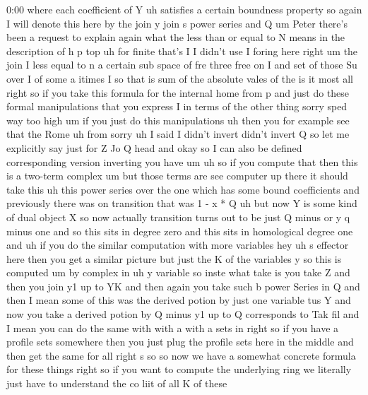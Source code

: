 \begin{unfinished}{0:00}
where  each  coefficient  of  Y  uh  satisfies
a  certain  boundness  property  so  again  I
will  denote  this  here  by  the
join  y  join  s  power  series  and
Q  um  Peter  there's  been  a  request  to
explain  again  what  the  less  than  or
equal  to  N  means  in  the  description  of  h
p
top
uh  for
finite
that's
I  I  didn't  use  I  foring  here  right
um  the  join  I  less  equal  to  n  a  certain
sub  space  of
fre  three  free  on  I  and  set  of  those  Su
over  I  of  some  a  itimes
I  so  that  is  sum  of  the  absolute  vales
of
the  is  it
most
all  right  so  if  you  take  this  formula
for  the  internal  home  from  p  and  just  do
these  formal  manipulations  that  you
express  I  in  terms  of  the  other  thing
sorry  sped  way  too
high  um  if  you  just  do  this
manipulations
uh  then  you  for  example  see  that  the
Rome  uh  from  sorry  uh  I  said  I  didn't
invert  didn't  invert  Q  so  let  me
explicitly  say  just  for  Z  Jo  Q  head  and
okay  so  I  can  also  be  defined
corresponding  version  inverting  you  have
um  uh  so  if  you  compute
that  then  this  is  a  two-term
complex  um  but  those  terms  are  see
computer  up  there  it  should  take  this  uh
this  power
series  over  the  one  which  has  some  bound
coefficients
and  previously  there  was  on  transition
that  was  1  -  x  *  Q  uh  but  now  Y  is  some
kind  of  dual  object  X  so  now  actually
transition  turns  out  to  be  just  Q  minus
or  y  q  minus
one  and  so  this  sits  in  degree  zero  and
this  sits  in  homological  degree
one
and
uh  if  you  do  the  similar  computation
with  more
variables  hey  uh  s  effector
here
then  you  get  a  similar  picture  but  just
the  K  of  the  variables  y  so  this  is
computed  um  by  complex  in  uh  y  variable
so  inste  what  take  is  you  take  Z  and
then  you  join  y1  up  to
YK  and  then  again  you  take  such  b  power
Series  in
Q  and  then  I  mean  some  of  this  was  the
derived  potion  by  just  one  variable  tus
Y  and  now  you  take  a  derived  potion  by  Q
minus  y1  up  to
Q  corresponds  to  Tak
fil
and  I  mean  you  can  do  the  same  with  with
a  with  a  sets  in  right  so  if  you  have  a
profile  sets  somewhere  then  you  just
plug  the  profile  sets  here  in  the  middle
and  then  get  the  same
for
all  right  s  so  so  now  we  have  a  somewhat
concrete  formula  for  these  things  right
so  if  you  want  to  compute  the  underlying
ring  we  literally  just  have  to
understand  the  co  liit  of  all  K  of  these

\end{unfinished}
